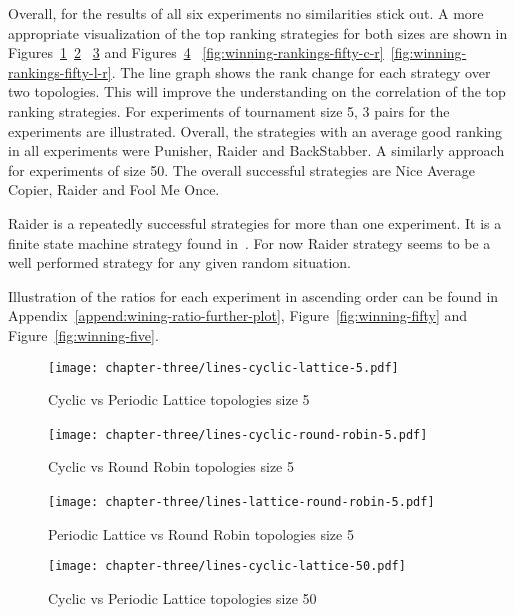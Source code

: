 Overall, for the results of all six experiments no similarities stick out.
A more appropriate visualization of the top ranking strategies for both
sizes are shown in Figures~\ref{fig:winning-rankings-five-c-l}~\ref{fig:winning-rankings-five-c-r}
~\ref{fig:winning-rankings-five-l-r} and Figures~\ref{fig:winning-rankings-fifty-c-l}
~\ref{fig:winning-rankings-fifty-c-r}~\ref{fig:winning-rankings-fifty-l-r}.
The line graph shows the rank change for each strategy over two topologies.
This will improve the understanding on the correlation of the top ranking strategies.
For experiments of tournament size 5, 3
pairs for the experiments are illustrated. Overall, the strategies with an
average good ranking in all experiments were Punisher, Raider and BackStabber.
A similarly approach for experiments of size 50.
The overall successful strategies are Nice Average Copier, Raider and Fool Me Once.

Raider is a repeatedly successful strategies for more than one experiment.
It is a finite state machine strategy found in~\cite{DBLP:conf/foci/AshlockTA14}.
For now Raider strategy seems to be a well performed strategy for any
given random situation.

Illustration of the ratios for each experiment in ascending order can be found
in Appendix~\ref{append:wining-ratio-further-plot},
Figure~\ref{fig:winning-fifty} and Figure~\ref{fig:winning-five}.

\begin{figure}[H]
	\centering
	\texttt{[image: chapter-three/lines-cyclic-lattice-5.pdf]}
	\caption{Cyclic vs Periodic Lattice topologies size 5}
	\label{fig:winning-rankings-five-c-l}
\end{figure}

\begin{figure}[H]
	\centering
	\texttt{[image: chapter-three/lines-cyclic-round-robin-5.pdf]}\
	\caption{Cyclic vs Round Robin topologies size 5}
	\label{fig:winning-rankings-five-c-r}
\end{figure}

\begin{figure}[H]
	\centering
	\texttt{[image: chapter-three/lines-lattice-round-robin-5.pdf]}\
	\caption{Periodic Lattice vs Round
	Robin topologies size 5}
	\label{fig:winning-rankings-five-l-r}
\end{figure}

\begin{figure}[H]
	\centering
	\texttt{[image: chapter-three/lines-cyclic-lattice-50.pdf]}
	\caption{Cyclic vs Periodic Lattice topologies size 50}
	\label{fig:winning-rankings-fifty-c-l}
\end{figure}

